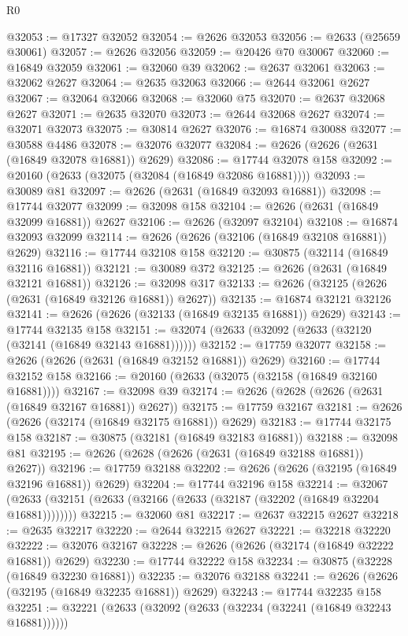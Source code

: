 \begin{lexlean}{R0}
\begin{coremodule}
@32053 := @17327 @32052
@32054 := @2626 @32053
@32056 := @2633 (@25659 @30061)
@32057 := @2626 @32056
@32059 := @20426 @70 @30067
@32060 := @16849 @32059
@32061 := @32060 @39
@32062 := @2637 @32061
@32063 := @32062 @2627
@32064 := @2635 @32063
@32066 := @2644 @32061 @2627
@32067 := @32064 @32066
@32068 := @32060 @75
@32070 := @2637 @32068 @2627
@32071 := @2635 @32070
@32073 := @2644 @32068 @2627
@32074 := @32071 @32073
@32075 := @30814 @2627
@32076 := @16874 @30088
@32077 := @30588 @4486
@32078 := @32076 @32077
@32084 := @2626 (@2626 (@2631 (@16849 @32078 @16881)) @2629)
@32086 := @17744 @32078 @158
@32092 := @20160 (@2633 (@32075 (@32084 (@16849 @32086 @16881))))
@32093 := @30089 @81
@32097 := @2626 (@2631 (@16849 @32093 @16881))
@32098 := @17744 @32077
@32099 := @32098 @158
@32104 := @2626 (@2631 (@16849 @32099 @16881)) @2627
@32106 := @2626 (@32097 @32104)
@32108 := @16874 @32093 @32099
@32114 := @2626 (@2626 (@32106 (@16849 @32108 @16881)) @2629)
@32116 := @17744 @32108 @158
@32120 := @30875 (@32114 (@16849 @32116 @16881))
@32121 := @30089 @372
@32125 := @2626 (@2631 (@16849 @32121 @16881))
@32126 := @32098 @317
@32133 := @2626 (@32125 (@2626 (@2631 (@16849 @32126 @16881)) @2627))
@32135 := @16874 @32121 @32126
@32141 := @2626 (@2626 (@32133 (@16849 @32135 @16881)) @2629)
@32143 := @17744 @32135 @158
@32151 := @32074 (@2633 (@32092 (@2633 (@32120 (@32141 (@16849 @32143 @16881))))))
@32152 := @17759 @32077
@32158 := @2626 (@2626 (@2631 (@16849 @32152 @16881)) @2629)
@32160 := @17744 @32152 @158
@32166 := @20160 (@2633 (@32075 (@32158 (@16849 @32160 @16881))))
@32167 := @32098 @39
@32174 := @2626 (@2628 (@2626 (@2631 (@16849 @32167 @16881)) @2627))
@32175 := @17759 @32167
@32181 := @2626 (@2626 (@32174 (@16849 @32175 @16881)) @2629)
@32183 := @17744 @32175 @158
@32187 := @30875 (@32181 (@16849 @32183 @16881))
@32188 := @32098 @81
@32195 := @2626 (@2628 (@2626 (@2631 (@16849 @32188 @16881)) @2627))
@32196 := @17759 @32188
@32202 := @2626 (@2626 (@32195 (@16849 @32196 @16881)) @2629)
@32204 := @17744 @32196 @158
@32214 := @32067 (@2633 (@32151 (@2633 (@32166 (@2633 (@32187 (@32202 (@16849 @32204 @16881))))))))
@32215 := @32060 @81
@32217 := @2637 @32215 @2627
@32218 := @2635 @32217
@32220 := @2644 @32215 @2627
@32221 := @32218 @32220
@32222 := @32076 @32167
@32228 := @2626 (@2626 (@32174 (@16849 @32222 @16881)) @2629)
@32230 := @17744 @32222 @158
@32234 := @30875 (@32228 (@16849 @32230 @16881))
@32235 := @32076 @32188
@32241 := @2626 (@2626 (@32195 (@16849 @32235 @16881)) @2629)
@32243 := @17744 @32235 @158
@32251 := @32221 (@2633 (@32092 (@2633 (@32234 (@32241 (@16849 @32243 @16881))))))

\end{coremodule}
\end{lexlean}
